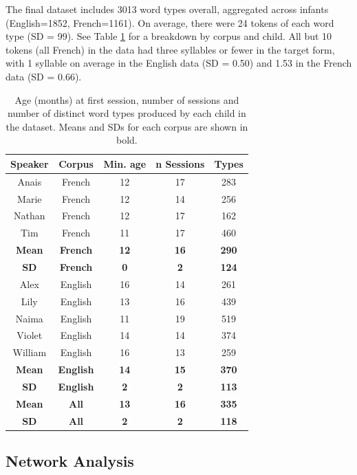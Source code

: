 \documentclass[
  man]{apa6}
\begin{document}
The final dataset includes 3013 word types overall, aggregated across infants (English=1852, French=1161). On average, there were 24 tokens of each word type (SD = 99). See Table \ref{tab:table-data-overview} for a breakdown by corpus and child. All but 10 tokens (all French) in the data had three syllables or fewer in the target form, with 1 syllable on average in the English data (SD = 0.50) and 1.53 in the French data (SD = 0.66).

\begin{longtable}[t]{ccccc}
\caption{\label{tab:table-data-overview}Age (months) at first session, number of sessions and number of distinct word types produced by each child in the dataset. Means and SDs for each corpus are shown in bold.}\\
\toprule
Speaker & Corpus & Min. age & n Sessions & Types\\
\midrule
Anais & French & 12 & 17 & 283\\
Marie & French & 12 & 14 & 256\\
Nathan & French & 12 & 17 & 162\\
Tim & French & 11 & 17 & 460\\
\midrule
\textbf{Mean} & \textbf{French} & \textbf{12} & \textbf{16} & \textbf{290}\\
\addlinespace
\textbf{SD} & \textbf{French} & \textbf{0} & \textbf{2} & \textbf{124}\\
\midrule
Alex & English & 16 & 14 & 261\\
Lily & English & 13 & 16 & 439\\
Naima & English & 11 & 19 & 519\\
Violet & English & 14 & 14 & 374\\
\addlinespace
William & English & 16 & 13 & 259\\
\midrule
\textbf{Mean} & \textbf{English} & \textbf{14} & \textbf{15} & \textbf{370}\\
\textbf{SD} & \textbf{English} & \textbf{2} & \textbf{2} & \textbf{113}\\
\midrule
\textbf{Mean} & \textbf{All} & \textbf{13} & \textbf{16} & \textbf{335}\\
\textbf{SD} & \textbf{All} & \textbf{2} & \textbf{2} & \textbf{118}\\
\bottomrule
\end{longtable}

\hypertarget{network-analysis}{%
\subsection{Network Analysis}\label{network-analysis}}
\end{document}
